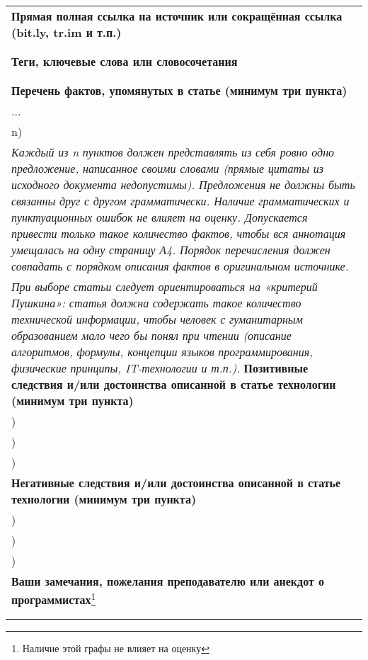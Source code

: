 \documentclass[12pt]{article}
\begin{document}
\begin{tabularx}{\textwidth} { 
  | >{\raggedright\arraybackslash}X|}
    \textbf{Прямая полная ссылка на источник или сокращённая ссылка (bit.ly, tr.im и т.п.)} \\
    \\
    \smallskip\\
    \hline
    \textbf{Теги, ключевые слова или словосочетания}\\
    \\
    \smallskip\\
    \hline
    \textbf{Перечень фактов, упомянутых в статье (минимум три пункта)}\\
    ...\\
    n)\\
    \textit{Каждый из n пунктов должен представлять из себя ровно одно предложение, написанное своими словами (прямые цитаты из исходного документа недопустимы). Предложения не должны быть связанны друг с другом грамматически. Наличие грамматических и пунктуационных ошибок не влияет на оценку. Допускается привести только такое количество фактов, чтобы вся аннотация умещалась на одну страницу А4. Порядок перечисления должен совпадать с порядком описания фактов в оригинальном источнике.}
    \smallskip\\
    \textit{При выборе статьи следует ориентироваться на «критерий Пушкина»: статья должна содержать такое количество технической информации, чтобы человек с гуманитарным образованием мало чего бы понял при чтении (описание алгоритмов, формулы, концепции языков программирования, физические принципы, IT-технологии и т.п.).}
    \hline
    \textbf{Позитивные следствия и/или достоинства описанной в статье технологии (минимум три пункта)}\\
    1) \\
    2) \\
    3) \\
    \hline
    \textbf{Негативные следствия и/или достоинства описанной в статье технологии (минимум три пункта)}\\
    1) \\
    2) \\
    3) \\
    \hline
    \textbf{Ваши замечания, пожелания преподавателю или анекдот о программистах}\footnote{Наличие этой графы не влияет на оценку}\\
    \bigskip\\
    \bigskip\\
    \hline
    
\end{tabularx}
\end{document}
